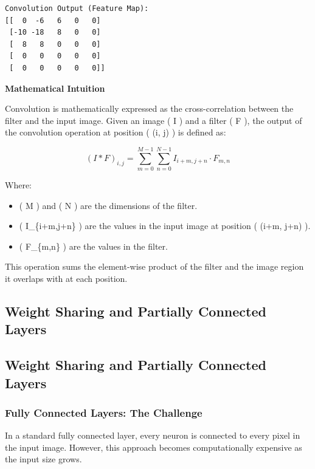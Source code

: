 \documentclass[
  letterpaper,
  DIV=11,
  numbers=noendperiod]{scrreprt}
\providecommand{\tightlist}{%
  \setlength{\itemsep}{0pt}\setlength{\parskip}{0pt}}\usepackage{longtable,booktabs,array}
\begin{document}
\begin{verbatim}
Convolution Output (Feature Map):
[[  0  -6   6   0   0]
 [-10 -18   8   0   0]
 [  8   8   0   0   0]
 [  0   0   0   0   0]
 [  0   0   0   0   0]]
\end{verbatim}

\textbf{Mathematical Intuition}

Convolution is mathematically expressed as the cross-correlation between
the filter and the input image. Given an image ( I ) and a filter ( F ),
the output of the convolution operation at position ( (i, j) ) is
defined as:

\[
(I * F)_{i,j} = \sum_{m=0}^{M-1} \sum_{n=0}^{N-1} I_{i+m,j+n} \cdot F_{m,n}
\]

Where:

\begin{itemize}
\tightlist
\item
  ( M ) and ( N ) are the dimensions of the filter.
\item
  ( I\_\{i+m,j+n\} ) are the values in the input image at position (
  (i+m, j+n) ).
\item
  ( F\_\{m,n\} ) are the values in the filter.
\end{itemize}

This operation sums the element-wise product of the filter and the image
region it overlaps with at each position.

\subsection{Weight Sharing and Partially Connected
Layers}\label{weight-sharing-and-partially-connected-layers}

\subsection{Weight Sharing and Partially Connected
Layers}\label{weight-sharing-and-partially-connected-layers-1}

\subsubsection{Fully Connected Layers: The
Challenge}\label{fully-connected-layers-the-challenge}

In a standard fully connected layer, every neuron is connected to every
pixel in the input image. However, this approach becomes computationally
expensive as the input size grows.
\end{document}
